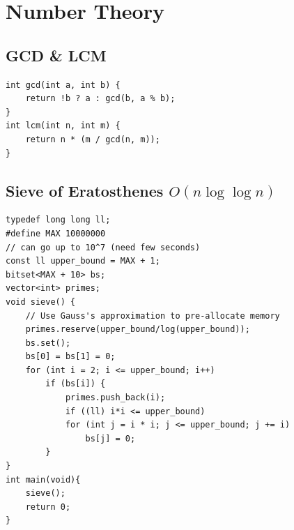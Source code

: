 \documentclass[12pt]{book}
\begin{document}
\chapter{Number Theory}
\section{GCD \& LCM}
\begin{verbatim}
int gcd(int a, int b) {
	return !b ? a : gcd(b, a % b);
}
int lcm(int n, int m) {
	return n * (m / gcd(n, m));
}
\end{verbatim}
\section{Sieve of Eratosthenes $O(n\log\log n)$}
\begin{verbatim}
typedef long long ll;
#define MAX 10000000
// can go up to 10^7 (need few seconds)
const ll upper_bound = MAX + 1;
bitset<MAX + 10> bs;
vector<int> primes;
void sieve() {
	// Use Gauss's approximation to pre-allocate memory
	primes.reserve(upper_bound/log(upper_bound));
	bs.set();
	bs[0] = bs[1] = 0;
	for (int i = 2; i <= upper_bound; i++)
		if (bs[i]) {
			primes.push_back(i);
			if ((ll) i*i <= upper_bound)
			for (int j = i * i; j <= upper_bound; j += i)
				bs[j] = 0;
		}
}
int main(void){
	sieve();
	return 0;
}
\end{verbatim}
\end{document}
